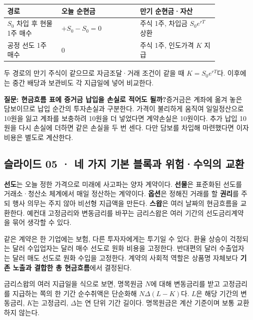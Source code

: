 \documentclass[11pt,a4paper]{article}
\begin{document}
\begin{center}\small\begin{tabular}{p{0.22\linewidth}p{0.32\linewidth}p{0.32\linewidth}}\hline
경로 & 오늘 순현금 & 만기 순현금·자산 \\ \hline
$S_0$ 차입 후 현물 1주 매수 & $+S_0-S_0=0$ & 주식 1주, 차입금 $S_0e^{rT}$ 상환 \\
공정 선도 1주 매수 & $0$ & 주식 1주, 인도가격 $K$ 지급 \\
\hline\end{tabular}\end{center}\normalsize

두 경로의 만기 주식이 같으므로 자금조달·거래 조건이 같을 때 $K=S_0e^{rT}$다. 이후에는 중간 배당과 보관비도 각 지급일에 넣어 비교한다.\par

\par\medskip\noindent\textbf{질문: 현금흐름 표에 증거금 납입을 손실로 적어도 될까?}\quad 증거금은 계좌에 옮겨 놓은 담보이므로 납입 순간의 투자손실과 구분한다. 가격이 불리하게 움직여 일일정산으로 10원을 잃고 계좌를 보충하려 10원을 더 넣었다면 계약손실은 10원이다. 추가 납입 10원을 다시 손실에 더하면 같은 손실을 두 번 센다. 다만 담보를 차입해 마련했다면 이자비용은 별도로 계산한다.\par

\subsection{슬라이드 05 · 네 가지 기본 블록과 위험·수익의 교환}
\textbf{선도}는 오늘 정한 가격으로 미래에 사고파는 양자 계약이다. \textbf{선물}은 표준화된 선도를 거래소·청산소 체계에서 매일 정산하는 계약이다. \textbf{옵션}은 정해진 거래를 할 \textbf{권리}를 주되 행사 의무는 주지 않아 비선형 지급액을 만든다. \textbf{스왑}은 여러 날짜의 현금흐름을 교환한다. 예컨대 고정금리와 변동금리를 바꾸는 금리스왑은 여러 기간의 선도금리계약을 묶어 생각할 수 있다.\par

같은 계약은 한 기업에는 보험, 다른 투자자에게는 투기일 수 있다. 환율 상승이 걱정되는 달러 수입업자는 달러 매수 선도로 원화 비용을 고정한다. 반대편의 달러 수출업자는 달러 매도 선도로 원화 수입을 고정한다. 계약의 사회적 역할은 상품명 자체보다 \textbf{기존 노출과 결합한 총 현금흐름}에서 결정된다.\par

금리스왑의 여러 지급일을 식으로 보면, 명목원금 $N$에 대해 변동금리를 받고 고정금리를 지급하는 쪽의 한 기간 순수취액은 단순화해 $N\Delta(L-K)$다. $L$은 해당 기간의 변동금리, $K$는 고정금리, $\Delta$는 연 단위 기간 길이다. 명목원금은 계산 기준이며 보통 교환하지 않는다.\par
\end{document}

